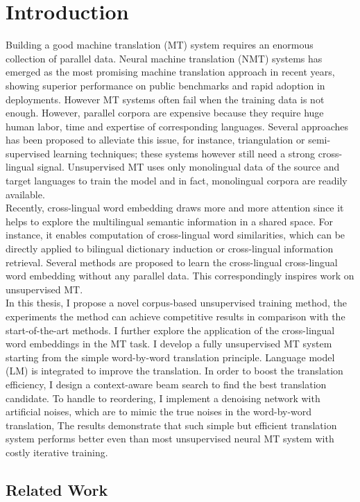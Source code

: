 
\chapter{Introduction}
Building a good machine translation (MT) system requires an enormous collection of parallel data. Neural machine translation (NMT) systems has emerged as the
most promising machine translation approach in recent years, showing superior performance on public benchmarks and rapid adoption in deployments. However MT systems often fail when the training data is not enough. However, parallel corpora are expensive because they require huge human labor, time and expertise of corresponding languages.
\indent Several approaches has been proposed to alleviate this issue, for instance, triangulation or semi-supervised learning techniques; these systems however still need a strong cross-lingual signal. Unsupervised MT uses only monolingual data of the source and target languages to train the model and in fact, monolingual corpora are readily available.\\
Recently, cross-lingual word embedding draws more and more attention since it helps to explore the multilingual semantic information in a shared space. For instance, it enables computation of cross-lingual word similarities, which  can be directly applied to bilingual dictionary induction or cross-lingual information retrieval. Several methods are proposed to learn the cross-lingual cross-lingual word embedding without any parallel data. This correspondingly inspires work on unsupervised MT.\\
In this thesis, I propose a novel corpus-based unsupervised training method, the experiments the method can achieve competitive results  in comparison with the start-of-the-art methods. I further explore the 
application of the cross-lingual word embeddings in the MT task.
I develop a fully unsupervised MT system starting from the simple word-by-word translation principle. Language model (LM) is integrated to improve the translation. In order to boost the translation efficiency, I design a context-aware beam search to find the best translation candidate. To handle to reordering, I implement a denoising network with artificial noises, which are to mimic the true noises in the word-by-word translation, The results demonstrate that such simple but efficient translation system performs better even than most unsupervised neural MT system with costly iterative training.


\section{Related Work}

